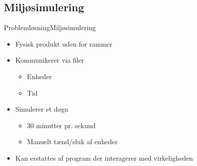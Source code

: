 \subsection{Miljøsimulering}
\begin{frame}{Problemløsning}{Miljøsimulering}
\begin{itemize}
	\item Fysisk produkt uden for rammer
	\item Kommunikerer via filer
	\begin{itemize}
		\item Enheder
		\item Tid
	\end{itemize}
	\item Simulerer et døgn
	\begin{itemize}
		\item 30 minutter pr. sekund
		\item Manuelt tænd/sluk af enheder
	\end{itemize}
	\item Kan erstattes af program der interagerer med virkeligheden
\end{itemize}
\end{frame}